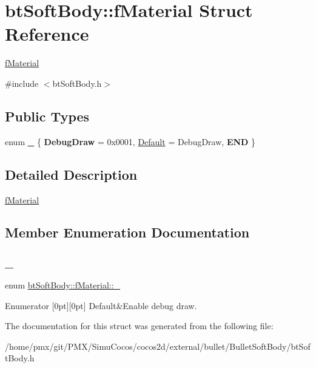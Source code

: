 \hypertarget{structbtSoftBody_1_1fMaterial}{}\section{bt\+Soft\+Body\+:\+:f\+Material Struct Reference}
\label{structbtSoftBody_1_1fMaterial}


\hyperlink{structbtSoftBody_1_1fMaterial}{f\+Material}  




{\ttfamily \#include $<$bt\+Soft\+Body.\+h$>$}

\subsection*{Public Types}
\begin{DoxyCompactItemize}
\item 
enum \hyperlink{structbtSoftBody_1_1fMaterial_a6cc6df1c89b51761f169222062ec5ca8}{\+\_\+} \{ {\bfseries Debug\+Draw} = 0x0001, 
\hyperlink{structbtSoftBody_1_1fMaterial_a6cc6df1c89b51761f169222062ec5ca8af84f8e3bf24e47554c5278e654ddc0bb}{Default} = Debug\+Draw, 
{\bfseries E\+ND}
 \}
\end{DoxyCompactItemize}


\subsection{Detailed Description}
\hyperlink{structbtSoftBody_1_1fMaterial}{f\+Material} 

\subsection{Member Enumeration Documentation}
\mbox{\label{structbtSoftBody_1_1fMaterial_a6cc6df1c89b51761f169222062ec5ca8}} 
\subsubsection{\texorpdfstring{\+\_\+}{\_}}
{\footnotesize\ttfamily enum \hyperlink{structbtSoftBody_1_1fMaterial_a6cc6df1c89b51761f169222062ec5ca8}{bt\+Soft\+Body\+::f\+Material\+::\+\_\+}}

\begin{DoxyEnumFields}{Enumerator}
[0pt][0pt]{}\mbox{\label{structbtSoftBody_1_1fMaterial_a6cc6df1c89b51761f169222062ec5ca8af84f8e3bf24e47554c5278e654ddc0bb}} 
Default&Enable debug draw. \\
\hline

\end{DoxyEnumFields}


The documentation for this struct was generated from the following file\+:\begin{DoxyCompactItemize}
\item 
/home/pmx/git/\+P\+M\+X/\+Simu\+Cocos/cocos2d/external/bullet/\+Bullet\+Soft\+Body/bt\+Soft\+Body.\+h\end{DoxyCompactItemize}
